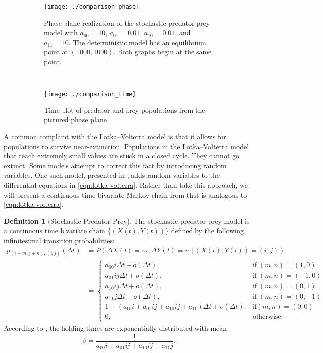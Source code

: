 \documentclass[12pt]{article}
\theoremstyle{definition}
\newtheorem{defn}{Definition}
\begin{document}
\begin{figure}[p]
    \centering
    \begin{subfigure}[t]{.5\textwidth}
        \texttt{[image: ./comparison\_phase]}
        \caption{Phase plane realization of the stochastic predator prey model
        with $a_{00} = 10$, $a_{01} = 0.01$, $a_{10} = 0.01$, and $a_{11} =
        10$. The deterministic model has an equilibrium point at $(1000,
        1000)$. Both graphs begin at the same point.}
    \end{subfigure}%
    ~~~ %
    \begin{subfigure}[t]{.5\textwidth}
        \texttt{[image: ./comparison\_time]}
        \caption{Time plot of predator and prey populations from the pictured
        phase plane.}
    \end{subfigure}
    \caption{}
    \label{fig:comparison}
\end{figure}

A common complaint with the Lotka--Volterra model is that it allows for
populations to survive near-extinction. Populations in the Lotka--Volterra
model that reach extremely small values are stuck in a closed cycle. They
cannot go extinct. Some models attempt to correct this fact by introducing
random variables. One such model, presented in \cite{mao2003asymptotic}, adds
random variables to the differential equations in \eqref{eqn:lotka-volterra}.
Rather than take this approach, we will present a continuous time bivariate
Markov chain from \cite{allen2010introduction} that is analogous to
\eqref{eqn:lotka-volterra}.

\begin{defn}[Stochastic Predator Prey]
    \label{defn:predator-prey}
    The stochastic predator prey model is a continuous time bivariate chain
    $\{(X(t), Y(t))\}$ defined by the following infinitesimal transition
    probabilities:
    \begin{align*}
        p_{(i + m, j + n), (i, j)}(\Delta t) &= P(\Delta X(t) = m, \Delta Y(t) =
        n \mid (X(t), Y(t)) = (i, j)) \\
        &=
        \begin{cases}
            a_{00} i \Delta t + o(\Delta t), & \text{if } (m, n) = (1, 0) \\
            a_{01} ij \Delta t + o(\Delta t), & \text{if } (m, n) = (-1, 0) \\
            a_{10} ij \Delta t + o(\Delta t), & \text{if } (m, n) = (0, 1) \\
            a_{11} j \Delta t + o(\Delta t), & \text{if } (m, n) = (0, -1) \\
            1 - (a_{00}i + a_{01}ij + a_{10} ij + a_{11})\Delta t + o(\Delta
                t), & \text{if} (m, n) = (0, 0) \\
            0, & \text{otherwise.}
        \end{cases}
    \end{align*}
    According to \cite{allen2010introduction}, the holding times are
    exponentially distributed with mean $$\beta = \frac{1}{a_{00}i + a_{01}ij +
    a_{10}ij + a_{11}j}.$$
\end{defn}
\end{document}
